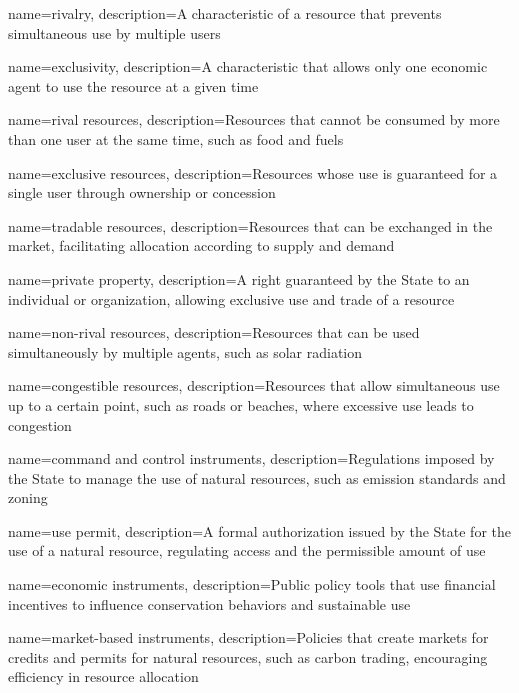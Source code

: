 {
	name=rivalry,
	description={A characteristic of a resource that prevents simultaneous use by multiple users}
}

{
	name=exclusivity,
	description={A characteristic that allows only one economic agent to use the resource at a given time}
}

{
	name=rival resources,
	description={Resources that cannot be consumed by more than one user at the same time, such as food and fuels}
}

{
	name=exclusive resources,
	description={Resources whose use is guaranteed for a single user through ownership or concession}
}

{
	name=tradable resources,
	description={Resources that can be exchanged in the market, facilitating allocation according to supply and demand}
}

{
	name=private property,
	description={A right guaranteed by the State to an individual or organization, allowing exclusive use and trade of a resource}
}

{
	name=non-rival resources,
	description={Resources that can be used simultaneously by multiple agents, such as solar radiation}
}

{
	name=congestible resources,
	description={Resources that allow simultaneous use up to a certain point, such as roads or beaches, where excessive use leads to congestion}
}

{
	name=command and control instruments,
	description={Regulations imposed by the State to manage the use of natural resources, such as emission standards and zoning}
}

{
	name=use permit,
	description={A formal authorization issued by the State for the use of a natural resource, regulating access and the permissible amount of use}
}

{
	name=economic instruments,
	description={Public policy tools that use financial incentives to influence conservation behaviors and sustainable use}
}

{
	name=market-based instruments,
	description={Policies that create markets for credits and permits for natural resources, such as carbon trading, encouraging efficiency in resource allocation}
}

